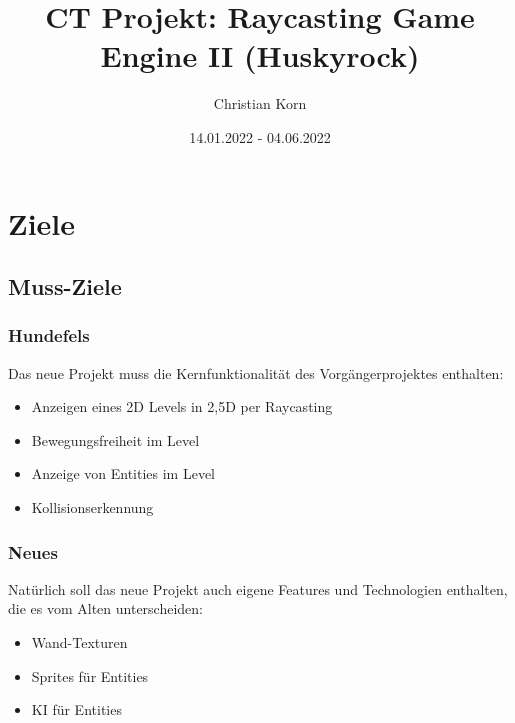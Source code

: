\documentclass[a4paper,titlepage]{article}
\title{CT Projekt: Raycasting Game Engine II (Huskyrock)}
\author{Christian Korn}
\date{14.01.2022 - 04.06.2022}
\begin{document}
    
    \maketitle
    \tableofcontents
    
    
    \newpage
    
    \section{Ziele}
    
    \subsection{Muss-Ziele}
    
    \subsubsection*{Hundefels}
    
    Das neue Projekt muss die Kernfunktionalität des Vorgängerprojektes enthalten:
    
    \begin{itemize}
        \item Anzeigen eines 2D Levels in 2,5D per Raycasting \checkmark
        \item Bewegungsfreiheit im Level \checkmark
        \item Anzeige von Entities im Level \checkmark
        \item Kollisionserkennung \checkmark
    \end{itemize}
    
    \subsubsection*{Neues}
    
    Natürlich soll das neue Projekt auch eigene Features und Technologien enthalten, die es vom Alten unterscheiden:
    
    \begin{itemize}
        \item Wand-Texturen \checkmark
        \item Sprites für Entities \checkmark
        \item KI für Entities \checkmark
    \end{itemize}
    
\end{document}
